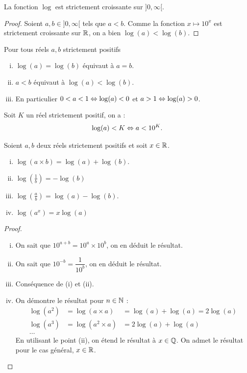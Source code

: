\documentclass[frenchb]{report}
\begin{document}
\begin{prop}
La fonction $\log$ est strictement croissante sur $]0, \infty[$.
\end{prop}

\begin{proof}
Soient $a, b \in ]0, \infty[$ tels que $a< b$. Comme la fonction $x \mapsto 10^x$ est strictement croissante sur $\mathbb{R}$, 
on a bien $\log(a) < \log(b)$.
\end{proof}

\begin{coro}
Pour tous réels $a, b$ strictement positifs
\begin{enumerate}[(i)]
\item $\log(a) = \log(b)$ équivaut à $a=b$.
\item $a < b$ équivaut à $\log(a) < \log(b)$. 
\item En particulier $0 < a <1 \Leftrightarrow \log(a) < 0$ et $a>1\Leftrightarrow \log(a)>0$.
\end{enumerate}
\end{coro}

\begin{prop}[Seuil]
Soit $K$ un réel strictement positif, on a :
\[ \log(a) < K \Leftrightarrow a < 10^K. \]
\end{prop}

\begin{prop}
Soient $a, b$ deux réels strictement positifs et soit $x \in \mathbb{R}$.
\begin{enumerate}[(i)]
\item $\log(a \times b) = \log(a) + \log(b)$.
\item $\log(\frac1{b})= - \log(b)$
\item $\log \left ( \frac{a}{b} \right ) = \log(a) - \log(b)$.
\item $\log(a^x)=x \log(a)$
\end{enumerate}
\end{prop}

\begin{proof}
\begin{enumerate}[(i)]
\item On sait que $10^{a+b} = 10^{a} \times 10^b$, on en déduit le résultat.
\item On sait que $10^{-b} = \dfrac1{10^b}$, on en déduit le résultat.
\item Conséquence de (i) et (ii).
\item On démontre le résultat pour $n \in \mathbb{N}$ : 
\begin{align*}
\log(a^2) & = \log(a \times a) & = \log(a) + \log(a) = 2 \log(a) \\
\log(a^3) & = \log(a^2 \times a) & = 2 \log(a) + \log(a) \\
\dots
\end{align*}
En utilisant le point (ii), on étend le résultat à $x \in \mathbb{Q}$. On admet le résultat pour le cas général, $x \in \mathbb{R}$.
\end{enumerate}
\end{proof}
\end{document}
